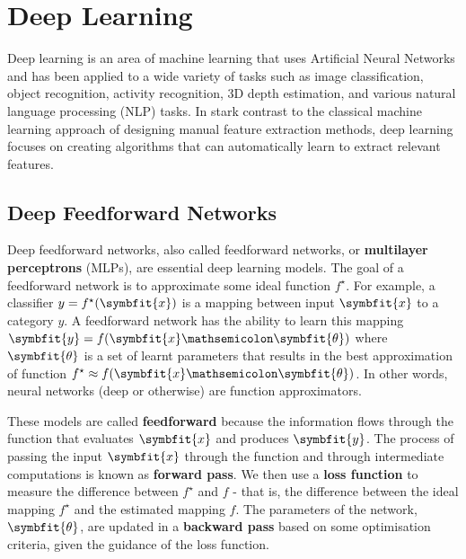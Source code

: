 \chapter{Deep Learning} \label{chap:basics-of-dl}

Deep learning is an area of machine learning that uses Artificial Neural Networks \parencite{mcculloch1943logical} and has been applied to a wide variety of tasks such as image classification, object recognition, activity recognition, 3D depth estimation, and various natural language processing (NLP) tasks. In stark contrast to the classical machine learning approach of designing manual feature extraction methods, deep learning focuses on creating algorithms that can automatically learn to extract relevant features.

\section{Deep Feedforward Networks} \label{sec:feed-forward-nets}

Deep feedforward networks, also called feedforward networks, or \textbf{multilayer perceptrons} (MLPs), are essential deep learning models. The goal of a feedforward network is to approximate some ideal function \(f^\star\). 
For example, a classifier \(y = f^\star(\symbfit{x})\) is a mapping between input $\symbfit{x}$ to a category $y$. A feedforward network has the ability to learn this mapping \(\symbfit{y} = f(\symbfit{x} \mathsemicolon \symbfit{\theta})\) where $\symbfit{\theta}$ is a set of learnt parameters that results in the best approximation of function $f^\star \approx f(\symbfit{x} \mathsemicolon \symbfit{\theta})$. In other words, neural networks (deep or otherwise) are function approximators.

These models are called \textbf{feedforward} because the information flows through the function that evaluates $\symbfit{x}$ and produces $\symbfit{y}$. The process of passing the input $\symbfit{x}$ through the function and through intermediate computations is known as \textbf{forward pass}.
We then use a \textbf{loss function} to measure the difference between $f^\star$ and $f$ - that is, the difference between the ideal mapping $f^\star$ and the estimated mapping $f$. 
The parameters of the network, $\symbfit{\theta}$, are updated in a \textbf{backward pass} based on some optimisation criteria, given the guidance of the loss function. 

